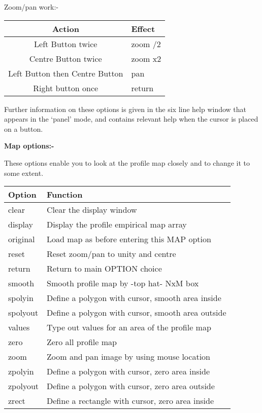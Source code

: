 \begin{small}
{{Zoom/pan work:- \hspace*{4ex}\begin{tabular}{|c|l|}\hline
Action                         & Effect \\ \hline
Left Button twice              & zoom /2 \\
Centre Button twice            & zoom x2 \\
Left Button then Centre Button & pan \\
Right button once              & return \\ \hline
\end{tabular}


 Further information on these options is given in the six line help
 window that appears in the `panel' mode, and contains relevant help
 when the cursor is placed on a button.


 {\bf \hspace*{2em} Map options:-}

 These options enable you to look at the profile map closely and to
 change it to some extent.

 \begin{tabular}{|l|p{4.5in}|}\hline
 Option & Function \\ \hline
 clear         &  Clear the display window \\
 display       &  Display the profile empirical map array \\
 original      &  Load map as before entering this MAP option \\
 reset         &  Reset zoom/pan to unity and centre \\
 return        &  Return to main OPTION choice \\
 smooth        &  Smooth profile map by -top hat- NxM box \\
 spolyin       &  Define a polygon with cursor, smooth area inside \\
 spolyout      &  Define a polygon with cursor, smooth area outside \\
 values        &  Type out values for an area of the profile map \\
 zero          &  Zero all profile map \\
 zoom          &  Zoom and pan image by using mouse location \\
 zpolyin       &  Define a polygon with cursor, zero area inside \\
 zpolyout      &  Define a polygon with cursor, zero area outside \\
 zrect         &  Define a rectangle with cursor, zero area inside \\
 \hline\end{tabular}


}}
\end{small}
